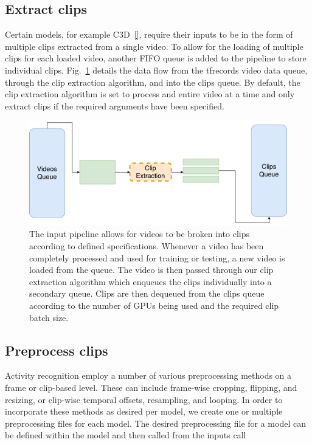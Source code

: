 \documentclass{llncs}
\begin{document}
\subsection{Extract clips}
\label{sec:extractclips}
Certain models, for example C3D~\ref{}, require their inputs to be in the form of multiple clips extracted from a single video.
To allow for the loading of multiple clips for each loaded video, another FIFO queue is added to the pipeline to store individual clips.
Fig.~\ref{fig:extract_clips} details the data flow from the tfrecords video data queue, through the clip extraction algorithm, and into the clips queue.
By default, the clip extraction algorithm is set to process and entire video at a time and only extract clips if the required arguments have been specified.

\begin{figure}[b!]
\centering
\includegraphics[width=0.8\columnwidth]{images/extract_clips.pdf}
\caption{The input pipeline allows for videos to be broken into clips according to defined specifications.
Whenever a video has been completely processed and used for training or testing, a new video is loaded from the queue.
The video is then passed through our clip extraction algorithm which enqueues the clips individually into a secondary queue.
Clips are then dequeued from the clips queue according to the number of GPUs being used and the required clip batch size.}
\label{fig:extract_clips}
\end{figure}


\subsection{Preprocess clips}
\label{sec:preprocessclips}
Activity recognition employ a number of various preprocessing methods on a frame or clip-based level.
These can include frame-wise cropping, flipping, and resizing, or clip-wise temporal offsets, resampling, and looping.
In order to incorporate these methods as desired per model, we create one or multiple preprocessing files for each model.
The desired preprocessing file for a model can be defined within the model and then called from the inputs call 
\end{document}
